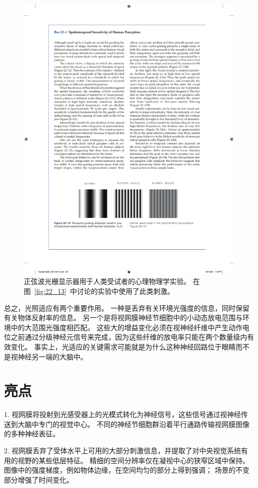\begin{figure}[htbp]
	\centering
	\includegraphics[width=0.83\linewidth]{chap22/fig_22_12}
	\caption{正弦波光栅显示器用于人类受试者的心理物理学实验。
		在图~\ref{fig:22_13}~中讨论的实验中使用了此类刺激。}
	\label{fig:22_12}
\end{figure}


总之，光照适应有两个重要作用。
一种是丢弃有关环境光强度的信息，同时保留有关物体反射率的信息。
另一个是将视网膜神经节细胞中的小动态放电范围与环境中的大范围光强度相匹配。
这些大的增益变化必须在视神经纤维中产生动作电位之前通过分级神经元信号来完成，因为这些纤维的放电率只能在两个数量级内有效变化。
事实上，光适应的关键需求可能就是为什么这种神经回路位于眼睛而不是视神经另一端的大脑中。



\section{亮点}

1. 视网膜将投射到光感受器上的光模式转化为神经信号，这些信号通过视神经传送到大脑中专门的视觉中心。 
不同的神经节细胞群沿着平行通路传输视网膜图像的多种神经表征。


2. 视网膜丢弃了受体水平上可用的大部分刺激信息，并提取了对中央视觉系统有用的视野的某些低层特征。
精细的空间分辨率仅在凝视中心的狭窄区域中保持。
图像中的强度梯度，例如物体边缘，在空间均匀的部分上得到强调；
场景的不变部分增强了时间变化。


